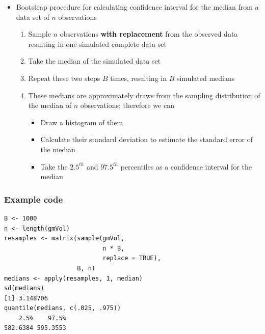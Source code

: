 \documentclass[aspectratio=169]{beamer}
\begin{document}
\begin{frame}
\begin{itemize}
\item Bootstrap procedure for calculating confidence interval for the median from a data
  set of $n$ observations
  \begin{enumerate}[$i.$]
  \item Sample $n$ observations {\bf with replacement} from the observed
    data resulting in one simulated complete data set
  \item Take the median of the simulated data set
  \item Repeat these two steps $B$ times, resulting in $B$ simulated
    medians
  \item These medians are approximately draws from the sampling distribution
    of the median of $n$ observations; therefore we can
    \begin{itemize}
    \item Draw a histogram of them
    \item Calculate their standard deviation to estimate the standard error
      of the median
    \item Take the $2.5^{th}$ and $97.5^{th}$ percentiles as a confidence interval
      for the median
    \end{itemize}
  \end{enumerate}
\end{itemize}
\end{frame}

\begin{frame}[fragile]\frametitle{Example code}
\begin{verbatim}
B <- 1000
n <- length(gmVol)
resamples <- matrix(sample(gmVol,
                           n * B,
                           replace = TRUE),
                    B, n)
medians <- apply(resamples, 1, median)
sd(medians)
[1] 3.148706
quantile(medians, c(.025, .975))
    2.5%    97.5% 
582.6384 595.3553 
\end{verbatim}
\end{frame}
\end{document}
